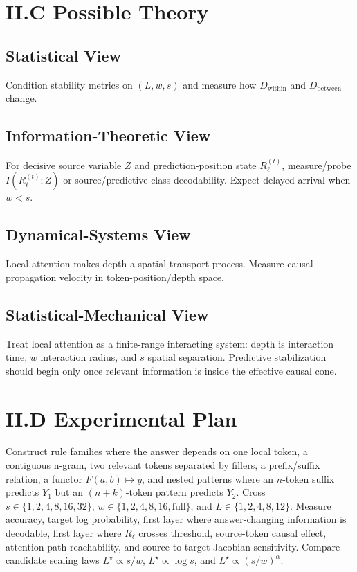 \documentclass[10pt]{article}
\begin{document}
\section{II.C Possible Theory}
\subsection{Statistical View} Condition stability metrics on $(L,w,s)$ and measure how $D_{\mathrm{within}}$ and $D_{\mathrm{between}}$ change.
\subsection{Information-Theoretic View} For decisive source variable $Z$ and prediction-position state $R_\ell^{(t)}$, measure/probe $I(R_\ell^{(t)};Z)$ or source/predictive-class decodability. Expect delayed arrival when $w<s$.
\subsection{Dynamical-Systems View} Local attention makes depth a spatial transport process. Measure causal propagation velocity in token-position/depth space.
\subsection{Statistical-Mechanical View} Treat local attention as a finite-range interacting system: depth is interaction time, $w$ interaction radius, and $s$ spatial separation. Predictive stabilization should begin only once relevant information is inside the effective causal cone.

\section{II.D Experimental Plan}
Construct rule families where the answer depends on one local token, a contiguous n-gram, two relevant tokens separated by fillers, a prefix/suffix relation, a functor $F(a,b)\mapsto y$, and nested patterns where an $n$-token suffix predicts $Y_1$ but an $(n+k)$-token pattern predicts $Y_2$. Cross $s\in\{1,2,4,8,16,32\}$, $w\in\{1,2,4,8,16,\mathrm{full}\}$, and $L\in\{1,2,4,8,12\}$. Measure accuracy, target log probability, first layer where answer-changing information is decodable, first layer where $R_\ell$ crosses threshold, source-token causal effect, attention-path reachability, and source-to-target Jacobian sensitivity. Compare candidate scaling laws $L^\star\propto s/w$, $L^\star\propto\log s$, and $L^\star\propto(s/w)^\alpha$.
\end{document}
